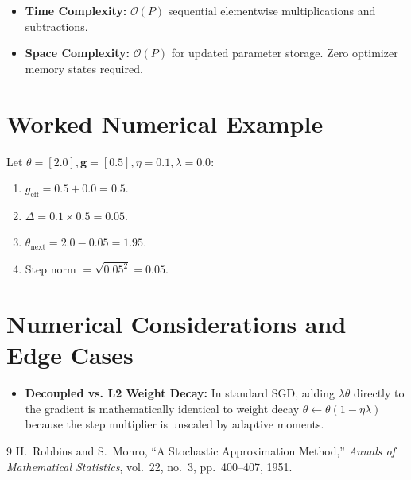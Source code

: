 \documentclass[11pt]{article}
\begin{document}
\begin{itemize}
    \item \textbf{Time Complexity:} $\mathcal{O}(P)$ sequential elementwise multiplications and subtractions.
    \item \textbf{Space Complexity:} $\mathcal{O}(P)$ for updated parameter storage. Zero optimizer memory states required.
\end{itemize}

\section{Worked Numerical Example}
\label{sec:worked_example}

Let $\theta = [2.0], \mathbf{g} = [0.5], \eta = 0.1, \lambda = 0.0$:
\begin{enumerate}
    \item $g_{\mathrm{eff}} = 0.5 + 0.0 = 0.5$.
    \item $\Delta = 0.1 \times 0.5 = 0.05$.
    \item $\theta_{\mathrm{next}} = 2.0 - 0.05 = 1.95$.
    \item Step norm $= \sqrt{0.05^2} = 0.05$.
\end{enumerate}

\section{Numerical Considerations and Edge Cases}
\label{sec:numerical}

\begin{itemize}
    \item \textbf{Decoupled vs. L2 Weight Decay:} In standard SGD, adding $\lambda \theta$ directly to the gradient is mathematically identical to weight decay $\theta \gets \theta(1 - \eta \lambda)$ because the step multiplier is unscaled by adaptive moments.
\end{itemize}

\begin{thebibliography}{9}
 H.~Robbins and S.~Monro, ``A Stochastic Approximation Method,'' \emph{Annals of Mathematical Statistics}, vol.~22, no.~3, pp.~400--407, 1951.
\end{thebibliography}
\end{document}
